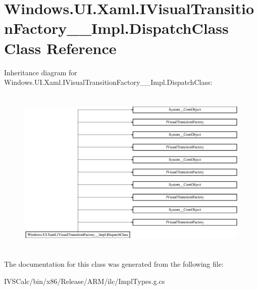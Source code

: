 \hypertarget{class_windows_1_1_u_i_1_1_xaml_1_1_i_visual_transition_factory_____impl_1_1_dispatch_class}{}\section{Windows.\+U\+I.\+Xaml.\+I\+Visual\+Transition\+Factory\+\_\+\+\_\+\+Impl.\+Dispatch\+Class Class Reference}
\label{class_windows_1_1_u_i_1_1_xaml_1_1_i_visual_transition_factory_____impl_1_1_dispatch_class}
Inheritance diagram for Windows.\+U\+I.\+Xaml.\+I\+Visual\+Transition\+Factory\+\_\+\+\_\+\+Impl.\+Dispatch\+Class\+:\begin{figure}[H]
\begin{center}
\leavevmode
\includegraphics[height=8.148149cm]{class_windows_1_1_u_i_1_1_xaml_1_1_i_visual_transition_factory_____impl_1_1_dispatch_class}
\end{center}
\end{figure}


The documentation for this class was generated from the following file\+:\begin{DoxyCompactItemize}
\item 
I\+V\+S\+Calc/bin/x86/\+Release/\+A\+R\+M/ilc/Impl\+Types.\+g.\+cs\end{DoxyCompactItemize}
